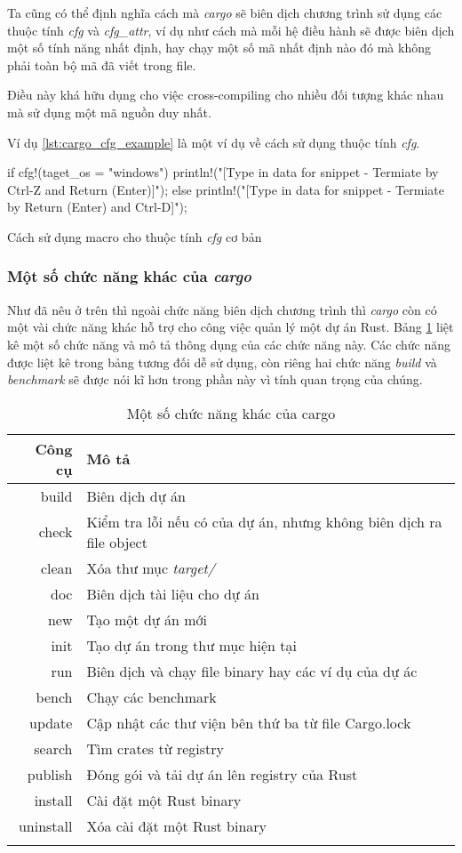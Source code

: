 Ta cũng có thể định nghĩa cách mà \emph{cargo} sẽ biên dịch chương trình sử dụng các thuộc tính \emph{cfg} và \emph{cfg\_attr}, ví dụ như cách mà mỗi hệ điều hành sẽ được biên dịch một số tính năng nhất định, hay chạy một số mã nhất định nào đó mà không phải toàn bộ mã đã viết trong file.

Điều này khá hữu dụng cho việc cross-compiling cho nhiều đối tượng khác nhau mà sử dụng một mã nguồn duy nhất.

Ví dụ \ref{lst:cargo_cfg_example} là một ví dụ về cách sử dụng thuộc tính \emph{cfg}.
\begin{listing}
\begin{rustcode}
if cfg!(taget_os = "windows") {
    println!("[Type in data for snippet - Termiate by Ctrl-Z and Return (Enter)]");
} else {
    println!("[Type in data for snippet - Termiate by Return (Enter) and Ctrl-D]");
}
\end{rustcode}
\caption{Cách sử dụng macro cho thuộc tính \emph{cfg} cơ bản}
\label{lst:cargo_cfg_example}
\end{listing}

\subsubsection{Một số chức năng khác của \emph{cargo}}\label{lbl:cargo_other_features}
Như đã nêu ở trên thì ngoài chức năng biên dịch chương trình thì \emph{cargo} còn có một vài chức năng khác hỗ trợ cho công việc quản lý một dự án Rust.
Bảng \ref{tbl:cargo_other_features} liệt kê một số chức năng và mô tả thông dụng của các chức năng này.
Các chức năng được liệt kê trong bảng tương đối dễ sử dụng, còn riêng hai chức năng \emph{build} và \emph{benchmark} sẽ được nói kĩ hơn trong phần này vì tính quan trọng của chúng.

\clearpage
\begin{longtable}{r|l}
\textbf{Công cụ} & \textbf{Mô tả} \\
\endhead
\midrule
build & Biên dịch dự án \\
check & Kiểm tra lỗi nếu có của dự án, nhưng không biên dịch ra file object \\
clean & Xóa thư mục \emph{target/} \\
doc & Biên dịch tài liệu cho dự án \\
new & Tạo một dự án mới \\
init & Tạo dự án trong thư mục hiện tại \\
run & Biên dịch và chạy file binary hay các ví dụ của dự ác \\
bench & Chạy các benchmark \\
update & Cập nhật các thư viện bên thứ ba từ file Cargo.lock \\
search & Tìm crates từ registry \\
publish & Đóng gói và tải dự án lên registry của Rust \\
install & Cài đặt một Rust binary \\
uninstall & Xóa cài đặt một Rust binary \\
\bottomrule
\caption{Một số chức năng khác của cargo}
\label{tbl:cargo_other_features}
\end{longtable}

